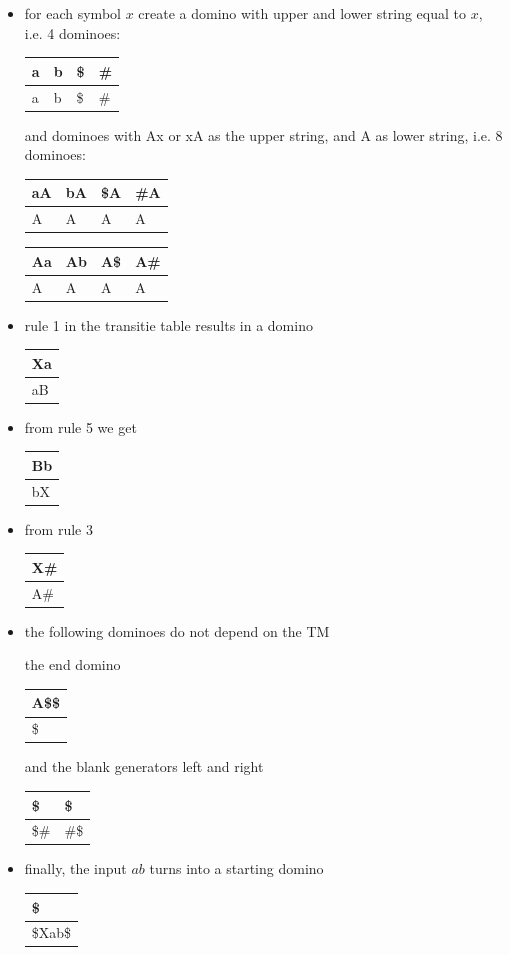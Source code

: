 \begin{itemize}
\item for each symbol $x$ create a domino with upper and lower string
  equal to $x$, i.e. 4 dominoes:
\begin{tabular}{|l||l||l||l|}
\hline
a & b & \$ & \# \\ \hline
a & b & \$ & \# \\
\hline
\end{tabular}
and dominoes with Ax or xA as the upper string, and A as lower
string, i.e. 8 dominoes:
\begin{tabular}{|l||l||l||l|}
\hline
aA & bA & \$A & \#A \\ \hline
A & A & A & A \\
\hline
\end{tabular}
\begin{tabular}{|l||l||l||l|}
\hline
Aa & Ab & A\$ & A\# \\ \hline
A & A & A & A \\
\hline
\end{tabular}

\item rule 1 in the transitie table results in a domino
\begin{tabular}{|l|}
\hline
Xa \\ \hline
aB \\
\hline
\end{tabular}

\item from rule 5 we get
\begin{tabular}{|l|}
\hline
Bb \\ \hline
bX \\
\hline
\end{tabular}

\item
from rule 3
\begin{tabular}{|l|}
\hline
X\# \\ \hline
A\# \\
\hline
\end{tabular}


\item
the following dominoes do not depend on the TM

the end domino
\begin{tabular}{|l|}
\hline
A\$\$                     \\ \hline
   \$                     \\ 
\hline
\end{tabular}
and the blank generators left and right
\begin{tabular}{|l||l|}
\hline
        \$   & \$         \\ \hline
        \$\# & \#\$       \\ 
\hline
\end{tabular}

\item
finally, the input $ab$ turns into a starting domino
\begin{tabular}{|l|}
\hline
\$ \\ \hline
\$Xab\$ \\ 
\hline
\end{tabular}
\end{itemize}

